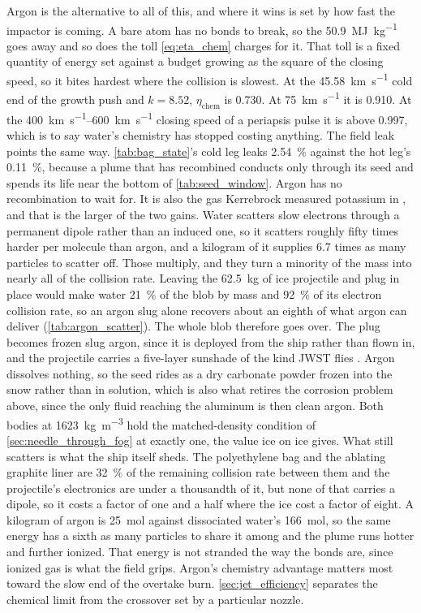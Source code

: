\documentclass{article}
\begin{document}
Argon is the alternative to all of this, and where it wins is set by how fast the impactor is coming. A bare atom has no bonds to break, so the \SI{50.9}{\mega\joule\per\kilogram} goes away and so does the toll \autoref{eq:eta_chem} charges for it. That toll is a fixed quantity of energy set against a budget growing as the square of the closing speed, so it bites hardest where the collision is slowest. At the \SI{45.58}{\kilo\meter\per\second} cold end of the growth push and $k = 8.52$, $\eta_{\mathrm{chem}}$ is \num{0.730}. At \SI{75}{\kilo\meter\per\second} it is \num{0.910}. At the \SIrange{400}{600}{\kilo\meter\per\second} closing speed of a periapsis pulse it is above \num{0.997}, which is to say water's chemistry has stopped costing anything. The field leak points the same way. \autoref{tab:bag_state}'s cold leg leaks \SI{2.54}{\percent} against the hot leg's \SI{0.11}{\percent}, because a plume that has recombined conducts only through its seed and spends its life near the bottom of \autoref{tab:seed_window}. Argon has no recombination to wait for. It is also the gas Kerrebrock measured potassium in \cite{kerrebrock1964nonequilibrium}, and that is the larger of the two gains. Water scatters slow electrons through a permanent dipole rather than an induced one, so it scatters roughly fifty times harder per molecule than argon, and a kilogram of it supplies \num{6.7} times as many particles to scatter off. Those multiply, and they turn a minority of the mass into nearly all of the collision rate. Leaving the \SI{62.5}{\kilogram} of ice projectile and plug in place would make water \SI{21}{\percent} of the blob by mass and \SI{92}{\percent} of its electron collision rate, so an argon slug alone recovers about an eighth of what argon can deliver (\autoref{tab:argon_scatter}). The whole blob therefore goes over. The plug becomes frozen slug argon, since it is deployed from the ship rather than flown in, and the projectile carries a five-layer sunshade of the kind JWST flies \cite{jwst_sunshield}. Argon dissolves nothing, so the seed rides as a dry carbonate powder frozen into the snow rather than in solution, which is also what retires the corrosion problem above, since the only fluid reaching the aluminum is then clean argon. Both bodies at \SI{1623}{\kilogram\per\cubic\meter} hold the matched-density condition of \autoref{sec:needle_through_fog} at exactly one, the value ice on ice gives. What still scatters is what the ship itself sheds. The polyethylene bag and the ablating graphite liner are \SI{32}{\percent} of the remaining collision rate between them and the projectile's electronics are under a thousandth of it, but none of that carries a dipole, so it costs a factor of one and a half where the ice cost a factor of eight. A kilogram of argon is \SI{25}{\mole} against dissociated water's \SI{166}{\mole}, so the same energy has a sixth as many particles to share it among and the plume runs hotter and further ionized. That energy is not stranded the way the bonds are, since ionized gas is what the field grips. Argon's chemistry advantage matters most toward the slow end of the overtake burn. \autoref{sec:jet_efficiency} separates the chemical limit from the crossover set by a particular nozzle.
\end{document}
